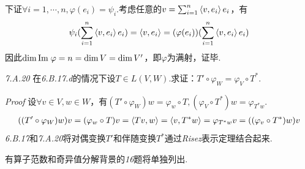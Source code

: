 下证\(\forall i=1,\cdots,n,\varphi(e_i)=\psi_i\).考虑任意的\(v=\sum_{i=1}^n \left\langle v,e_i \right\rangle e_i\)，有
    \begin{align*}
        \psi_i(\sum_{i=1}^n \left\langle v,e_i \right\rangle e_i)=\left\langle v,e_i \right\rangle=(\varphi(e_i))(\sum_{i=1}^n \left\langle v,e_i \right\rangle e_i)
    \end{align*}
因此\(\dim \mathrm{Im \;} \varphi=n=\dim V=\dim V'\)，即\(\varphi\)为满射，证毕.

\hspace*{\fill}

\textit{7.A.20}
在\textit{6.B.17.d}的情况下设\(T \in L(V,W)\).求证：\(T' \circ \varphi_W=\varphi_V \circ T^*\).

\textit{Proof}
设\(\forall v \in V,w \in W\)，有\((T' \circ \varphi_W)w=\varphi_w \circ T,(\varphi_V \circ T^*)w=\varphi_{T^*w}\).
    \begin{align*}
        ((T' \circ \varphi_W)w)v=(\varphi_w \circ T)v=\left\langle Tv,w \right\rangle
        =\left\langle v,T^*w \right\rangle=\varphi_{T^*w}v=((\varphi_v \circ T^*)w)v
    \end{align*}
\textit{6.B.17}和\textit{7.A.20}将对偶变换\(T'\)和伴随变换\(T^*\)通过\textit{Risez}表示定理结合起来.

\hspace*{\fill}

有算子范数和奇异值分解背景的\textit{16}题将单独列出.


